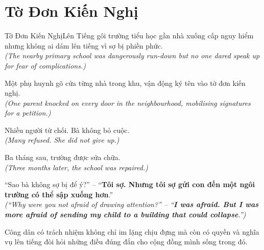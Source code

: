 \section{Tờ Đơn Kiến Nghị}
\begin{truyen}{Tờ Đơn Kiến Nghị}{Lên Tiếng}
gôi trường tiểu học gần nhà xuống cấp nguy hiểm nhưng không ai dám lên tiếng vì sợ bị phiền phức.\\
\textit{(The nearby primary school was dangerously run-down but no one dared speak up for fear of complications.)}

Một phụ huynh gõ cửa từng nhà trong khu, vận động ký tên vào tờ đơn kiến nghị.\\
\textit{(One parent knocked on every door in the neighbourhood, mobilising signatures for a petition.)}

Nhiều người từ chối. Bà không bỏ cuộc.\\
\textit{(Many refused. She did not give up.)}

Ba tháng sau, trường được sửa chữa.\\
\textit{(Three months later, the school was repaired.)}

``Sao bà không sợ bị để ý?'' – ``\textbf{Tôi sợ. Nhưng tôi sợ gửi con đến một ngôi trường có thể sập xuống hơn}.''\\
\textit{(``Why were you not afraid of drawing attention?'' – ``\textbf{I was afraid. But I was more afraid of sending my child to a building that could collapse}.'')}
\end{truyen}
\begin{baihoc}
  Công dân có trách nhiệm không chỉ im lặng chịu đựng mà còn có quyền và nghĩa vụ lên tiếng đòi hỏi những điều đúng đắn cho cộng đồng mình sống trong đó.
\end{baihoc}
